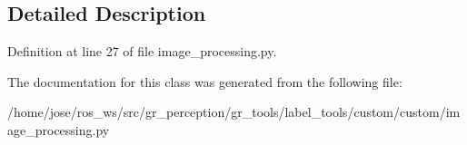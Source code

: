 \subsection{Detailed Description}


Definition at line 27 of file image\+\_\+processing.\+py.



The documentation for this class was generated from the following file\+:\begin{DoxyCompactItemize}
\item 
/home/jose/ros\+\_\+ws/src/gr\+\_\+perception/gr\+\_\+tools/label\+\_\+tools/custom/custom/image\+\_\+processing.\+py\end{DoxyCompactItemize}
